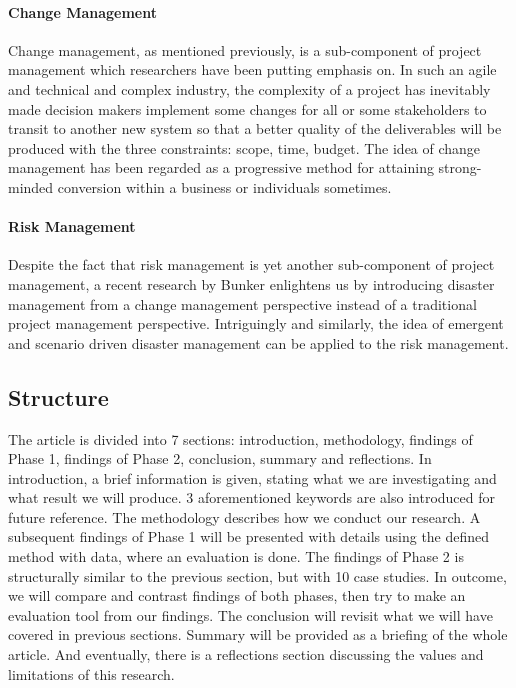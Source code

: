 \paragraph{Change Management}
Change management, as mentioned previously, is a sub-component of project management which researchers\parencite{3,6} have been putting emphasis on. In such an agile and technical and complex industry, the complexity of a project has inevitably made decision makers implement some changes for all or some stakeholders to transit to another new system\parencite[p. 1]{3} so that a better quality of the deliverables will be produced with the three constraints: scope, time, budget. The idea of change management has been regarded as a progressive method for attaining strong-minded conversion within a business or individuals sometimes\parencite[p. 3]{3}.

\paragraph{Risk Management}
Despite the fact that risk management is yet another sub-component of project management, a recent research by Bunker enlightens us by introducing disaster management from a change management perspective instead of a traditional project management perspective\parencite[p. 10]{6}. Intriguingly and similarly, the idea of emergent and scenario driven disaster management can be applied to the risk management.

\subsection{Structure}
The article is divided into 7 sections: introduction, methodology, findings of Phase 1, findings of Phase 2, conclusion, summary and reflections. In introduction, a brief information is given, stating what we are investigating and what result we will produce. 3 aforementioned keywords are also introduced for future reference. The methodology describes how we conduct our research. A subsequent findings of Phase 1 will be presented with details using the defined method with data, where an evaluation is done. The findings of Phase 2 is structurally similar to the previous section, but with 10 case studies. In outcome, we will compare and contrast findings of both phases, then try to make an evaluation tool from our findings. The conclusion will revisit what we will have covered in previous sections. Summary will be provided as a briefing of the whole article. And eventually, there is a reflections section discussing the values and limitations of this research.
